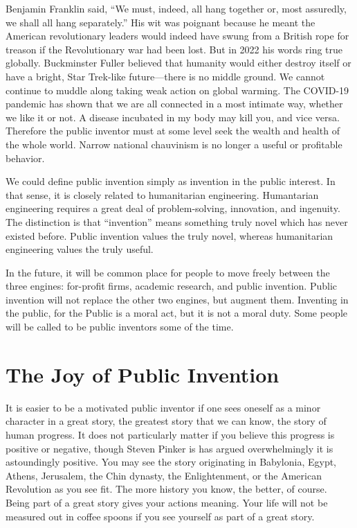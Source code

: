 \documentclass[
	fontsize=10pt, %
	twoside=false, %
	secnumdepth=1, %
]{kaobook}
\begin{document}
Benjamin Franklin said, ``We must, indeed, all hang together or,
most assuredly, we shall all hang separately.''
His wit was poignant because he meant the American revolutionary
leaders would indeed have swung from a British rope for treason
if the Revolutionary war had been lost.
But in 2022 his words ring true globally. Buckminster Fuller
believed that humanity would either destroy itself or
have a bright, Star Trek-like future---there is no
middle ground.
We cannot continue to muddle along
taking weak action on global warming.
The COVID-19 pandemic has shown that we are all connected
in a most intimate way, whether we like it or not.
A disease incubated in my body may kill you, and vice versa.
Therefore the public inventor must at some level seek
the wealth and health of the whole world.
Narrow national chauvinism is no longer a useful or profitable
behavior.

We could define public invention simply as invention in the
public interest.
In that sense, it is closely related to humanitarian engineering.
Humantarian engineering requires a great deal of problem-solving,
innovation, and ingenuity.
The distinction is that ``invention''
means something truly novel which has never existed before.
Public  invention values the truly novel, whereas
humanitarian engineering values the truly useful.

In the future, it will be common place for people to move freely
between
the three engines: for-profit firms, academic research,
and public invention.
Public invention will not replace the other two engines,
but augment them.
Inventing in the public, for the Public is a moral act, but it is not a moral duty.
Some people will be called to be public inventors some of the time.

\chapter{The Joy of Public Invention}

It is easier to be a motivated public inventor
if one sees oneself as a minor character in a great story,
the greatest story that we can know, the story of human progress.
It does not particularly matter if you believe this progress
is positive or negative, though Steven Pinker is has argued overwhelmingly it
is astoundingly positive. \cite{Pinker2019}
You may see the story originating in
Babylonia, Egypt, Athens, Jerusalem, the Chin dynasty, the
Enlightenment, or the American Revolution as you see fit.
The more history you know, the better, of course.
Being part of a great story gives your actions meaning.
Your life will not be measured out in coffee spoons
if you see yourself as part of a great story.
\end{document}
